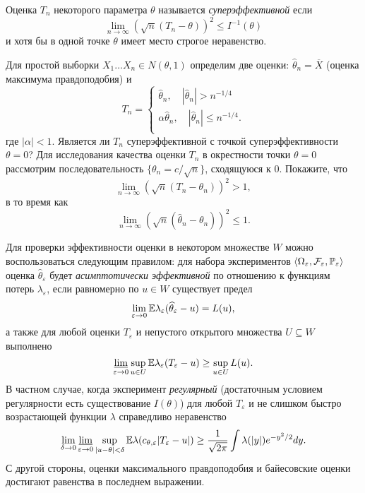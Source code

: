 \begin{problem}
Оценка $T_n$ некоторого параметра $\theta$ называется \textit{суперэффективной} если 
\[
\lim \limits_{n \to \infty}(  \sqrt{n} (T_n - \theta) )^2 \leq I^{-1}(\theta)
\] 
и хотя бы в одной точке $\theta$  имеет место строгое неравенство. 

Для простой выборки $X_1 \ldots X_n \in N(\theta, 1)$ определим две  оценки: $\widehat{\theta}_n = \overline{X}$ (оценка максимума правдоподобия) и 
\[
T_n = \begin{cases}
\widehat{\theta}_n, \quad |\widehat{\theta}_n| > n^{-1/4} \\
\alpha \widehat{\theta}_n, \quad |\widehat{\theta}_n| \leq n^{-1/4}. \\
\end{cases}
\]  
где $|\alpha| < 1$. Является ли $T_n$ суперэффективной с точкой суперэффективности $\theta = 0$?
Для исследования качества оценки  $T_n$ в окрестности точки  $\theta = 0$  рассмотрим последовательность $\{\theta_n = c/ \sqrt{n} \}$, сходящуюся к 0. Покажите, что 
\[
\lim \limits_{n \to \infty}(  \sqrt{n} (T_n - \theta_n) )^2 > 1,
\] 
в то время как 
\[
\lim \limits_{n \to \infty}(  \sqrt{n} (\widehat{\theta}_n - \theta_n) )^2 \leq 1.
\] 

\end{problem}

\begin{remark}
Для проверки эффективности оценки в некотором множестве $W$ можно воспользоваться следующим правилом: для набора экспериментов $\langle \Omega_\varepsilon, \mathcal{F}_\varepsilon, \mathrm{{\mathbb P}}_\varepsilon \rangle$ оценка $\widehat{\theta}_\varepsilon$ будет \textit{асимптотически эффективной} по отношению к функциям потерь $\lambda_\varepsilon$, если равномерно по $u \in W$ существует предел 
\[
\lim\limits_{\varepsilon \to 0} \mathrm{{\mathbb E}} \lambda_\varepsilon (\widehat{\theta}_\varepsilon - u) = L(u),
\]  
а также для любой оценки $T_\varepsilon$ и непустого открытого множества $U \subseteq W$ выполнено
\[
\mathop{\underline{\lim}} \limits_{\varepsilon \to 0} \sup \limits_{u \in U} \mathrm{{\mathbb E}} \lambda_\varepsilon (T_\varepsilon - u) \geq \sup \limits_{u \in U} L(u).
\]
В частном случае, когда эксперимент \textit{регулярный} (достаточным условием регулярности есть существование $I(\theta)$) для любой $T_\varepsilon$ и не слишком быстро возрастающей функции  $\lambda$ справедливо неравенство
\[
\lim\limits_{\delta \to 0} \mathop{\underline{\lim}} \limits_{\varepsilon \to 0}  
\sup \limits_{|u - \theta| < \delta} \mathrm{{\mathbb E}} \lambda (c_{\theta, \varepsilon} |T_\varepsilon - u|) \geq \frac{1}{\sqrt{2 \pi}} \int  \lambda(|y|)  e^{-y^2/2} dy.
\]
С другой стороны, оценки максимального правдоподобия и байесовские оценки достигают равенства в последнем выражении.
\end{remark}

